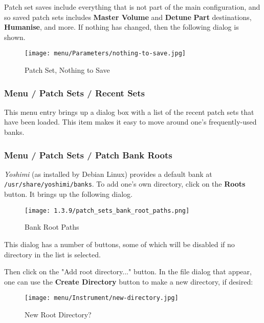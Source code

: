    Patch set saves include everything that is not part of the main
   configuration, and so saved patch sets
   includes \textbf{Master Volume} and \textbf{Detune}
   \textbf{Part} destinations, \textbf{Humanise},
   and more.
   If nothing has changed, then the following dialog is shown.

\begin{figure}[H]
   \centering 
   \texttt{[image: menu/Parameters/nothing-to-save.jpg]}
   \caption{Patch Set, Nothing to Save}
   \label{fig:yoshimi_menu_nothing_to_save_parameters}
\end{figure}

\subsubsection{Menu / Patch Sets / Recent Sets}
\label{subsubsec:menu_patch_sets_recent_sets}

   This menu entry brings up a dialog box with a list of the recent patch sets
   that have been loaded.  This item makes it easy to move around one's
   frequently-used banks.

\subsubsection{Menu / Patch Sets / Patch Bank Roots}
\label{subsubsec:menu_patch_sets_patch_bank_roots}

   \textsl{Yoshimi} (as installed by Debian Linux) provides a default bank at
   \texttt{/usr/share/yoshimi/banks}.
   To add one's own directory, click on the \textbf{Roots} button.
   It brings up the following dialog.

\begin{figure}[H]
   \centering 
   \texttt{[image: 1.3.9/patch\_sets\_bank\_root\_paths.png]}
   \caption{Bank Root Paths}
   \label{fig:bank_root_paths}
\end{figure}

   This dialog has a number of buttons, some of which will be disabled if no
   directory in the list is selected.

   Then click on the "Add root directory..." button.  In the file dialog that
   appear, one can use the \textbf{Create Directory} button to make a new
   directory, if desired:

\begin{figure}[H]
   \centering 
   \texttt{[image: menu/Instrument/new-directory.jpg]}
   \caption{New Root Directory?}
   \label{fig:new_root_directory}
\end{figure}


